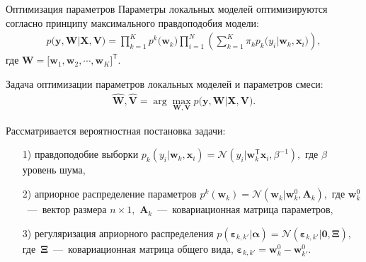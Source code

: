 \documentclass[9pt,pdf,hyperref={unicode}]{beamer}
\begin{document}
\begin{frame}{Оптимизация параметров}
\justifying
Параметры локальных моделей оптимизируются согласно принципу максимального правдоподобия модели:
\begin{equation*}
\begin{aligned}
p\bigr(\mathbf{y}, \mathbf{W}|\mathbf{X}, \mathbf{V}\bigr) = \prod_{k=1}^{K}p^{k}\bigr(\mathbf{w}_k\bigr)\prod_{i=1}^{N}\left(\sum_{k=1}^{K}\pi_{k}p_{k}\bigr(y_i|\mathbf{w}_k, \mathbf{x}_i\bigr)\right),
\end{aligned}
\end{equation*}
где $\mathbf{W} = \bigr[\mathbf{w}_1, \mathbf{w}_2, \cdots, \mathbf{w}_K\bigr]^{\mathsf{T}}.$

Задача оптимизации параметров локальных моделей и параметров смеси:
\begin{equation*}
\begin{aligned}
\hat{\mathbf{W}}, \hat{\mathbf{V}} = \arg\max_{\mathbf{W}, \mathbf{V}} p\bigr(\mathbf{y}, \mathbf{W}|\mathbf{X}, \mathbf{V}\bigr).
\end{aligned}
\end{equation*}

Рассматривается вероятностная постановка задачи:
\begin{enumerate}
	\item[1)] правдоподобие выборки $p_{k}\left(y_{i}|\mathbf{w}_{k}, \mathbf{x}_{i}\right) = \mathcal{N}\left(y_{i}|\mathbf{w}_{k}^{\mathsf{T}}\mathbf{x}_{i}, \beta^{-1}\right),$ где $\beta$ уровень шума,
	\item[2)] априорное распределение параметров $p^{k}\left(\mathbf{w}_{k}\right) = \mathcal{N}\left(\mathbf{w}_{k}|\mathbf{w}^{0}_{k}, \mathbf{A}_{k}\right),$ где $\mathbf{w}^{0}_{k}$~---~вектор размера $n\times1,$ $\mathbf{A}_{k}$~---~ковариационная матрица параметров,
	\item[3)] регуляризация априорного распределения $p\left(\bm{\varepsilon}_{k,k'}|\bm{\alpha}\right) = \mathcal{N}\left(\bm{\varepsilon}_{k,k'}|\mathbf{0},  \bm{\Xi}\right),$ где~$\bm{\Xi}$~---~ковариационная матрица общего вида, $\bm{\varepsilon}_{k,k'} = \mathbf{w}_{k}^{0}-\mathbf{w}_{k'}^{0}.$
\end{enumerate}

\end{frame}
\end{document}
